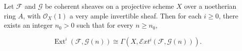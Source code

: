 Let $\mathcal{F}$ and $\mathcal{G}$ be coherent sheaves on a projective scheme $X$ over a noetherian ring $A$, with $\mathcal{O}_X(1)$ a very ample invertible sheaf. Then for each $i \geq 0$, there exists an integer $n_0 > 0$ such that for every $n \geq n_0$,

$$\operatorname{Ext}^i(\mathcal{F}, \mathcal{G}(n)) \cong \Gamma(X, \mathcal{E}xt^i(\mathcal{F}, \mathcal{G}(n))).$$

